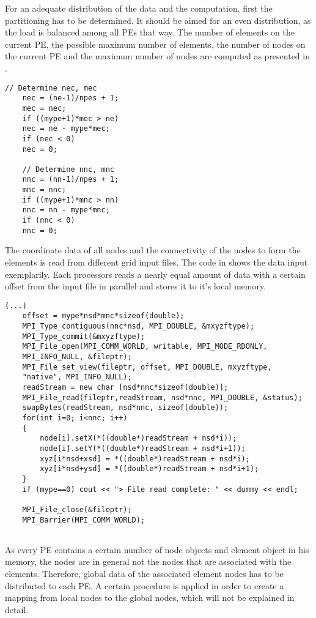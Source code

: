 For an adequate distribution of the data and the computation, first the partitioning has to be determined. It should be aimed for an even distribution, as the load is balanced among all PEs that way. The number of elements on the current PE, the possible maximum number of elements, the number of nodes on the current PE and the maximum number of nodes are computed as presented in .

\begin{lstlisting}[caption={\label{Code:MPI1} Determination of number elements on current rank and number nodes in current}]
	// Determine nec, mec
	nec = (ne-1)/npes + 1;
	mec = nec;
	if ((mype+1)*mec > ne)
	nec = ne - mype*mec;
	if (nec < 0)
	nec = 0;
	
	// Determine nnc, mnc
	nnc = (nn-1)/npes + 1;
	mnc = nnc;
	if ((mype+1)*mnc > nn)
	nnc = nn - mype*mnc;
	if (nnc < 0)
	nnc = 0;
\end{lstlisting}

The coordinate data of all nodes and the connectivity of the nodes to form the elements is read from different grid input files. The code in  shows the data input exemplarily. Each processors reads a nearly equal amount of data with a certain offset from the input file in parallel and stores it to it's local memory. 

\begin{lstlisting}[caption={\label{Code:MPI2} Read file for every rank with specific offset}]
	(...)
	offset = mype*nsd*mnc*sizeof(double);
	MPI_Type_contiguous(nnc*nsd, MPI_DOUBLE, &mxyzftype);
	MPI_Type_commit(&mxyzftype);
	MPI_File_open(MPI_COMM_WORLD, writable, MPI_MODE_RDONLY, 
	MPI_INFO_NULL, &fileptr);
	MPI_File_set_view(fileptr, offset, MPI_DOUBLE, mxyzftype, 
	"native", MPI_INFO_NULL);
	readStream = new char [nsd*nnc*sizeof(double)];
	MPI_File_read(fileptr,readStream, nsd*nnc, MPI_DOUBLE, &status);
	swapBytes(readStream, nsd*nnc, sizeof(double));
	for(int i=0; i<nnc; i++)
	{
		node[i].setX(*((double*)readStream + nsd*i));
		node[i].setY(*((double*)readStream + nsd*i+1));
		xyz[i*nsd+xsd] = *((double*)readStream + nsd*i);
		xyz[i*nsd+ysd] = *((double*)readStream + nsd*i+1);
	}
	if (mype==0) cout << "> File read complete: " << dummy << endl;
	
	MPI_File_close(&fileptr);
	MPI_Barrier(MPI_COMM_WORLD);
	
\end{lstlisting}

As every PE contains a certain number of node objects and element object in his memory, the nodes are in general not the nodes that are associated with the elements. Therefore, global data of the associated element nodes has to be distributed to each PE. A certain procedure is applied in order to create a mapping from local nodes to the global nodes, which will not be explained in detail.

